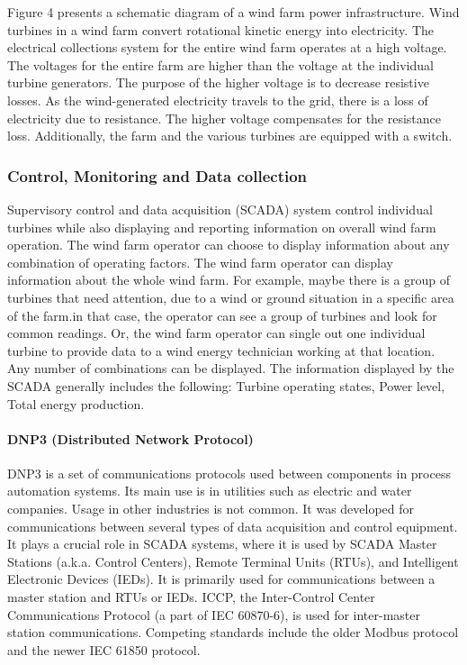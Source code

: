 \documentclass[twosided,a4,10pt]{article}
\begin{document}
\begin{multicols}{2}

Figure 4 presents a schematic diagram of a wind farm power infrastructure. Wind turbines in a wind farm convert rotational kinetic energy into electricity. \newline
The electrical collections system for the entire wind farm operates at a high voltage. The voltages for the entire farm are higher than the voltage at the individual turbine generators. The purpose of the higher voltage is to decrease resistive losses. As the wind-generated electricity travels to the grid, there is a loss of electricity due to resistance. The higher voltage compensates for the resistance loss. Additionally, the farm and the various turbines are equipped with a switch.
 \subsubsection{Control, Monitoring and Data collection}
 Supervisory control and data acquisition (SCADA) system control individual turbines while also displaying and reporting information on overall wind farm operation. The wind farm operator can choose to display information about any combination of operating factors.\newline
 The wind farm operator can display information about the whole wind farm. For example, maybe there is a group of turbines that need attention, due to a wind or ground situation in a specific area of the farm.in that case, the operator can see a group of turbines and look for common readings. Or, the wind farm operator can single out one individual turbine to provide data to a wind energy technician working at that location. Any number of combinations can be displayed. The information displayed by the SCADA generally includes the following: Turbine operating states, Power level, Total energy production.
 \paragraph{DNP3 (Distributed Network Protocol)}
 DNP3 is a set of communications protocols used between components in process automation systems. Its main use is in utilities such as electric and water companies. Usage in other industries is not common. It was developed for communications between several types of data acquisition and control equipment. It plays a crucial role in SCADA systems, where it is used by SCADA Master Stations (a.k.a. Control Centers), Remote Terminal Units (RTUs), and Intelligent Electronic Devices (IEDs). It is primarily used for communications between a master station and RTUs or IEDs. ICCP, the Inter-Control Center Communications Protocol (a part of IEC 60870-6), is used for inter-master station communications. Competing standards include the older Modbus protocol and the newer IEC 61850 protocol.
 

\end{multicols}
\end{document}

